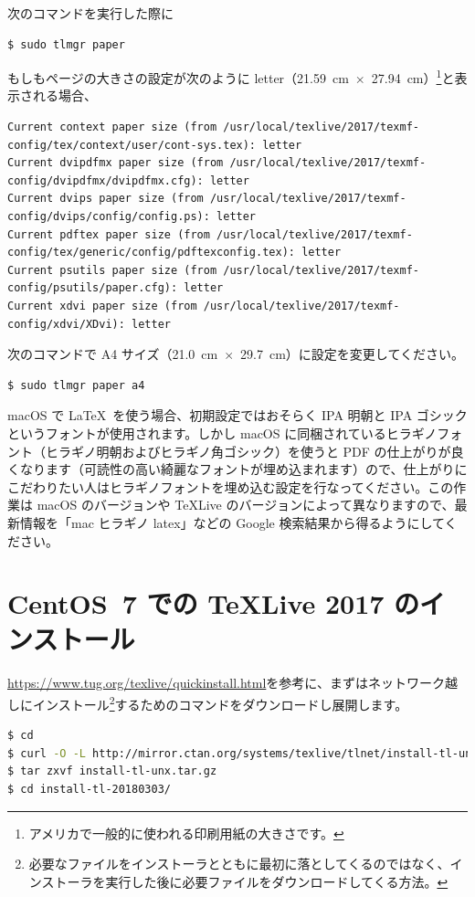 次のコマンドを実行した際に
\begin{lstlisting}[language=bash]
$ sudo tlmgr paper
\end{lstlisting}
もしもページの大きさの設定が次のように letter（21.59~cm~$\times$~27.94~cm）\footnote{アメリカで一般的に使われる印刷用紙の大きさです。}と表示される場合、
\begin{lstlisting}
Current context paper size (from /usr/local/texlive/2017/texmf-config/tex/context/user/cont-sys.tex): letter
Current dvipdfmx paper size (from /usr/local/texlive/2017/texmf-config/dvipdfmx/dvipdfmx.cfg): letter
Current dvips paper size (from /usr/local/texlive/2017/texmf-config/dvips/config/config.ps): letter
Current pdftex paper size (from /usr/local/texlive/2017/texmf-config/tex/generic/config/pdftexconfig.tex): letter
Current psutils paper size (from /usr/local/texlive/2017/texmf-config/psutils/paper.cfg): letter
Current xdvi paper size (from /usr/local/texlive/2017/texmf-config/xdvi/XDvi): letter
\end{lstlisting}
次のコマンドで A4 サイズ（21.0~cm~$\times$~29.7~cm）に設定を変更してください。
\begin{lstlisting}[language=bash]
$ sudo tlmgr paper a4
\end{lstlisting}

macOS で \LaTeX\ を使う場合、初期設定ではおそらく IPA 明朝と IPA ゴシックというフォントが使用されます。しかし macOS に同梱されているヒラギノフォント（ヒラギノ明朝およびヒラギノ角ゴシック）を使うと PDF の仕上がりが良くなります（可読性の高い綺麗なフォントが埋め込まれます）ので、仕上がりにこだわりたい人はヒラギノフォントを埋め込む設定を行なってください。この作業は macOS のバージョンや TeXLive のバージョンによって異なりますので、最新情報を「mac ヒラギノ latex」などの Google 検索結果から得るようにしてください。

\section{CentOS~7 での TeXLive 2017 のインストール}

\url{https://www.tug.org/texlive/quickinstall.html}を参考に、まずはネットワーク越しにインストール\footnote{必要なファイルをインストーラとともに最初に落としてくるのではなく、インストーラを実行した後に必要ファイルをダウンロードしてくる方法。}するためのコマンドをダウンロードし展開します。

\begin{lstlisting}[language=bash]
$ cd
$ curl -O -L http://mirror.ctan.org/systems/texlive/tlnet/install-tl-unx.tar.gz
$ tar zxvf install-tl-unx.tar.gz
$ cd install-tl-20180303/
\end{lstlisting}

